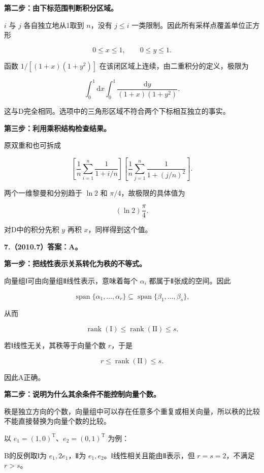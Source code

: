 \documentclass[UTF8,11pt,fontset=windows]{ctexart}
\begin{document}
\textbf{第二步：由下标范围判断积分区域。}

$i$ 与 $j$ 各自独立地从1取到 $n$，没有 $j\le i$ 一类限制。因此所有采样点覆盖单位正方形

$$
0\le x\le1,\qquad0\le y\le1.
$$

函数 $1/[(1+x)(1+y^2)]$ 在该闭区域上连续，由二重积分的定义，极限为

$$
\boxed{\int_0^1\mathrm dx\int_0^1
\frac{\mathrm dy}{(1+x)(1+y^2)}}.
$$

这与D完全相同。选项中的三角形区域不符合两个下标相互独立的事实。

\textbf{第三步：利用乘积结构检查结果。}

原双重和也可拆成

$$
\left[\frac1n\sum_{i=1}^n\frac1{1+i/n}\right]
\left[\frac1n\sum_{j=1}^n\frac1{1+(j/n)^2}\right].
$$

两个一维黎曼和分别趋于 $\ln2$ 和 $\pi/4$，故极限的具体值为

$$
(\ln2)\frac\pi4.
$$

对D中的积分先积 $y$ 再积 $x$，同样得到这个值。

\clearpage

\textbf{7.（2010.7）答案：A。}

\textbf{第一步：把线性表示关系转化为秩的不等式。}

向量组Ⅰ可由向量组Ⅱ线性表示，意味着每个 $\alpha_i$ 都属于Ⅱ张成的空间。因此

$$
\operatorname{span}\{\alpha_1,\ldots,\alpha_r\}
\subseteq\operatorname{span}\{\beta_1,\ldots,\beta_s\},
$$

从而

$$
\operatorname{rank}(\mathrm I)\le\operatorname{rank}(\mathrm {II})\le s.
$$

若Ⅰ线性无关，其秩等于向量个数 $r$，于是

$$
r\le\operatorname{rank}(\mathrm {II})\le s.
$$

因此A正确。

\textbf{第二步：说明为什么其余条件不能控制向量个数。}

秩是独立方向的个数，向量组中可以存在任意多个重复或相关向量，所以秩的比较不能直接替换为向量个数的比较。

以 $e_1=(1,0)^{\mathrm T}$、$e_2=(0,1)^{\mathrm T}$ 为例：

B的反例取Ⅰ为 $e_1,2e_1$，Ⅱ为 $e_1,e_2$。Ⅰ线性相关且能由Ⅱ表示，但 $r=s=2$，不满足 $r>s$。
\end{document}
